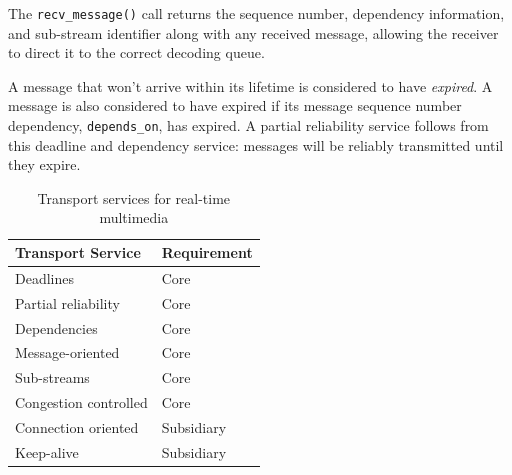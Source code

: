 \documentclass[10pt]{sig-alternate-05-2015}
\newcommand{\todo}[1]{\textbf{\textcolor{red}{To do -- #1}}}
\begin{document}
    The \texttt{recv\_message()} call returns the sequence number, dependency
    information, and sub-stream identifier along with any received message,
    allowing the receiver to direct it to the correct decoding queue.




A message that won't arrive within its lifetime is considered to have
\emph{expired}. A message is also considered to have expired if its
message sequence number dependency, \texttt{depends\_on},
has expired. A partial reliability service follows
from this deadline and dependency service: messages will be reliably
transmitted until they expire.

\begin{table}
  \scriptsize
  \centering
  \begin{tabular}{ll}
    \toprule
      Transport Service     & Requirement \\
    \midrule
      Deadlines             & Core        \\
      Partial reliability   & Core        \\
      Dependencies          & Core        \\
      Message-oriented      & Core        \\
      Sub-streams           & Core        \\
      Congestion controlled & Core        \\
      Connection oriented   & Subsidiary  \\
      Keep-alive            & Subsidiary  \\
    \bottomrule
  \end{tabular}
  \caption{Transport services for real-time multimedia}
  \label{tab:services}
\end{table}
\end{document}

